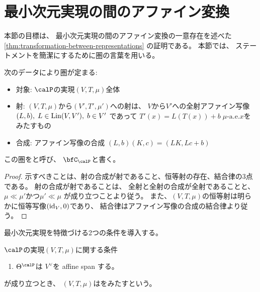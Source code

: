 \documentclass[report]{jlreq}
\begin{document}
\section{最小次元実現の間のアファイン変換}

本節の目標は、
最小次元実現の間のアファイン変換の一意存在を述べた
\cref{thm:transformation-between-representations}
の証明である。
本節では、
ステートメントを簡潔にするために圏の言葉を用いる。

\begin{propdef}
    次のデータにより圏が定まる:
    \begin{itemize}
        \item 対象: $\calP$の実現$(V, T, \mu)$全体
        \item 射: $(V, T, \mu)$から$(V', T', \mu')$への射は、
            $V$から$V'$への全射アファイン写像
            $(L, b), \; L \in \operatorname{Lin}(V, V'), \; b \in V'$
            であって
            $T'(x) = L(T(x)) + b \; \text{$\mu$-a.e.$x$}$をみたすもの
        \item 合成: アファイン写像の合成
            $(L, b)(K, c) = (LK, Lc + b)$
    \end{itemize}
    この圏をと呼び、
    $\bfC_\calP$と書く。
\end{propdef}

\begin{proof}
    示すべきことは、射の合成が射であること、恒等射の存在、結合律の3点である。
    射の合成が射であることは、
    全射と全射の合成が全射であることと、
    $\mu \ll \mu'$かつ$\mu' \ll \mu$
    が成り立つことより従う。
    また、$(V, T, \mu)$の恒等射は明らかに恒等写像$(\mathrm{id}_V, 0)$であり、
    結合律はアファイン写像の合成の結合律より従う。
\end{proof}

最小次元実現を特徴づける2つの条件を導入する。

\begin{definition}
    $\calP$の実現$(V, T, \mu)$に関する条件
    \begin{enumerate}
        \item $\Theta^\calP$は
            $V^\vee$を affine span する。
    \end{enumerate}
    が成り立つとき、
    $(V, T, \mu)$はをみたすという。
\end{definition}
\end{document}
